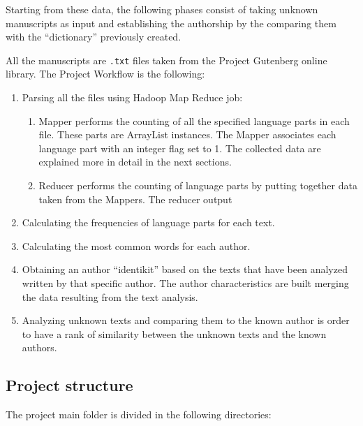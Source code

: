 \documentclass[a4paper,11pt, twoside]{article}
\begin{document}
	Starting from these data, the following phases consist of taking unknown manuscripts as input and establishing the authorship by the comparing them with the ``dictionary'' previously created. 
	
	All the manuscripts are \texttt{.txt} files taken from the Project Gutenberg\parencite{Gutenberg} online library.
	The Project Workflow is the following:
	\begin{enumerate}
		\item Parsing all the files using Hadoop Map Reduce job: 
		\begin{enumerate}
			\item Mapper performs the counting of all the specified language parts in each file. These parts are ArrayList instances. The Mapper associates each language part with an integer flag set to 1. The collected data are explained more in detail in the next sections. 
			
			\item Reducer performs the counting of language parts by putting together data taken from the Mappers. The reducer output  
		\end{enumerate}
		\item Calculating the frequencies of language parts for each text.
		\item Calculating the most common words for each author.
		\item Obtaining an author ``identikit'' based on the texts that have been analyzed written by that specific author. The author characteristics are built merging the data resulting from the text analysis.
		\item Analyzing unknown texts and comparing them to the known author is order to have a rank of similarity between the unknown texts and the known authors.
	\end{enumerate}

	\subsection{Project structure}
	The project main folder is divided in the following directories:
	\begin{figure}[h!]
	\end{figure}
\end{document}
